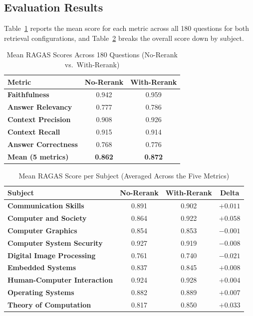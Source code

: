 \documentclass[12pt, a4paper, oneside]{report}
\let\oldsubsection\subsection
\renewcommand{\subsection}{%
  \addtocontents{toc}{\protect\needspace{3\baselineskip}}%
  \oldsubsection
}
\begin{document}
\subsection{Evaluation Results}

Table~\ref{tab:ragas_summary} reports the mean score for each metric across all 180 questions for both retrieval configurations, and Table~\ref{tab:ragas_subjects} breaks the overall score down by subject.

\begin{table}[H]
\centering
\caption{Mean RAGAS Scores Across 180 Questions (No-Rerank vs.\ With-Rerank)}
\label{tab:ragas_summary}
\begin{tabular}{>{\bfseries}p{5cm} c c}
\toprule
Metric & No-Rerank & With-Rerank \\
\midrule
Faithfulness        & 0.942 & 0.959 \\
Answer Relevancy    & 0.777 & 0.786 \\
Context Precision   & 0.908 & 0.926 \\
Context Recall      & 0.915 & 0.914 \\
Answer Correctness  & 0.768 & 0.776 \\
\midrule
\textbf{Mean (5 metrics)} & \textbf{0.862} & \textbf{0.872} \\
\bottomrule
\end{tabular}
\end{table}

\begin{table}[H]
\centering
\caption{Mean RAGAS Score per Subject (Averaged Across the Five Metrics)}
\label{tab:ragas_subjects}
\begin{tabular}{>{\bfseries}p{6cm} c c c}
\toprule
Subject & No-Rerank & With-Rerank & Delta \\
\midrule
Communication Skills       & 0.891 & 0.902 & $+0.011$ \\
Computer and Society       & 0.864 & 0.922 & $+0.058$ \\
Computer Graphics          & 0.854 & 0.853 & $-0.001$ \\
Computer System Security   & 0.927 & 0.919 & $-0.008$ \\
Digital Image Processing   & 0.761 & 0.740 & $-0.021$ \\
Embedded Systems           & 0.837 & 0.845 & $+0.008$ \\
Human-Computer Interaction & 0.924 & 0.928 & $+0.004$ \\
Operating Systems          & 0.882 & 0.889 & $+0.007$ \\
Theory of Computation      & 0.817 & 0.850 & $+0.033$ \\
\bottomrule
\end{tabular}
\end{table}
\end{document}
